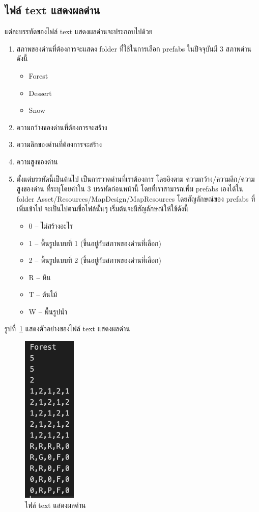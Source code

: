 \subsection{ไฟล์ text แสดงผลด่าน}
แต่ละบรรทัดของไฟล์ text แสดงผลด่านจะประกอบไปด้วย
\begin{enumerate}
    \item สภาพของด่านที่ต้องการจะแสดง folder ที่ใช้ในการเลือก prefabs ในปัจจุบันมี 3 สภาพด่าน ดังนี้
    \begin{itemize}
        \item Forest
        \item Dessert
        \item Snow
    \end{itemize}
    \item ความกว้างของด่านที่ต้องการจะสร้าง
    \item ความลึกของด่านที่ต้องการจะสร้าง
    \item ความสูงของด่าน
    \item ตั้งแต่บรรทัดนี้เป็นต้นไป เป็นการวาดด่านที่เราต้องการ โดยอิงตาม ความกว้าง/ความลึก/ความสูงของด่าน ที่ระบุโดยค่าใน 3 บรรทัดก่อนหน้านี้ โดยที่เราสามารถเพิ่ม prefabs เองได้ใน folder Asset/Resources/MapDesign/MapResources โดยสัญลักษณ์ของ prefabs ที่เพิ่มเข้าไป จะเป็นไปตามชื่อไฟล์นั้นๆ เริ่มต้นจะมีสัญลักษณ์ให้ใช้ดังนี้
    \begin{itemize}
        \item 0 -- ไม่สร้างอะไร
        \item 1 -- พื้นรูปแบบที่ 1 (ขึ้นอยู่กับสภาพของด่านที่เลือก)
        \item 2 -- พื้นรูปแบบที่ 2 (ขึ้นอยู่กับสภาพของด่านที่เลือก)
        \item R -- หิน
        \item T -- ต้นไม้
        \item W -- พื้นรูปน้ำ
    \end{itemize}
\end{enumerate}
รูปที่~\ref{ft1} แสดงตัวอย่างของไฟล์ text แสดงผลด่าน
\begin{figure}[H]
    \begin{center}
    \includegraphics[width=1in]{pic-toro/filetext2.png}
    \end{center}
    \caption[ไฟล์ text แสดงผลด่าน]{ไฟล์ text แสดงผลด่าน}
    \label{ft1}
\end{figure}

